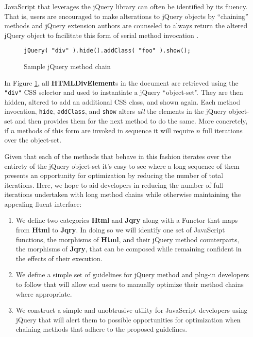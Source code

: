 \documentclass[preprint]{sigplanconf}
\begin{document}
JavaScript that leverages the jQuery library can often be identified by its fluency. That is, users are encouraged to make alterations to jQuery objects by ``chaining'' methods and jQuery extension authors are counseled to always return the altered jQuery object to facilitate this form of serial method invocation \cite{bib:chaining}.

\begin{figure}[!ht]
\small
\begin{verbatim}
jQuery( "div" ).hide().addClass( "foo" ).show();
\end{verbatim}
\nocaptionrule \caption{Sample jQuery method chain}
\label{fig:jquery-sample}
\end{figure}

In Figure \ref{fig:jquery-sample}, all \textbf{HTMLDivElement}s in the document are retrieved using the \verb|"div"| CSS selector and used to instantiate a jQuery ``object-set''. They are then hidden, altered to add an additional CSS class, and shown again. Each method invocation, \verb|hide|, \verb|addClass|, and \verb|show| alters \textit{all} the elements in the jQuery object-set and then provides them for the next method to do the same. More concretely, if \begin{math}n\end{math} methods of this form are invoked in sequence it will require \begin{math}n\end{math} full iterations over the object-set.

Given that each of the methods that behave in this fashion iterates over the entirety of the jQuery object-set it's easy to see where a long sequence of them presents an opportunity for optimization by reducing the number of total iterations. Here, we hope to aid developers in reducing the number of full iterations undertaken with long method chains while otherwise maintaining the appealing fluent interface:

\begin{enumerate}
\item We define two categories \textbf{Html} and \textbf{Jqry} along with a Functor that maps from \textbf{Html} to \textbf{Jqry}. In doing so we will identify one set of JavaScript functions, the morphisms of \textbf{Html}, and their jQuery method counterparts, the morphisms of \textbf{Jqry}, that can be composed while remaining confident in the effects of their execution.
\item We define a simple set of guidelines for jQuery method and plug-in developers to follow that will allow end users to manually optimize their method chains where appropriate.
\item We construct a simple and unobtrusive utility for JavaScript developers using jQuery that will alert them to possible opportunities for optimization when chaining methods that adhere to the proposed guidelines.
\end{enumerate}
\end{document}
